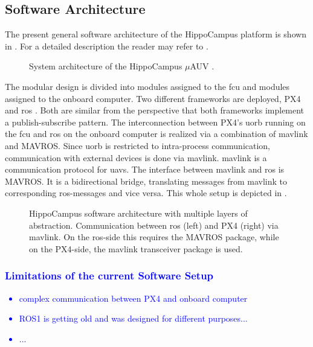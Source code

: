\subsection{Software Architecture}
The present general software architecture of the HippoCampus platform is shown in . For a detailed description the reader may refer to \cite{duecker-phd}. 
\begin{figure}[h!]
	\centering
     \def\svgwidth{12cm}  
	
	\caption{System architecture of the HippoCampus $\mu$AUV \cite{duecker-phd}.}
    \label{fig:software-architecture-overview}
\end{figure}
The modular design is divided into modules assigned to the \ac{fcu} and modules assigned to the onboard computer.
Two different frameworks are deployed, PX4 \cite{PX4} and \ac{ros} \cite{ros}.
Both are similar from the perspective that both frameworks implement a publish-subscribe pattern.
The interconnection between PX4's \ac{uorb} running on the \ac{fcu} and \ac{ros} on the onboard computer is realized via a combination of \ac{mavlink} \cite{mavlink} and MAVROS.
Since \ac{uorb} is restricted to intra-process communication, communication with external devices is done via \ac{mavlink}.
\ac{mavlink} is a communication protocol for \acp{uav}.
The interface between \ac{mavlink} and \ac{ros} is MAVROS. It is a bidirectional bridge, translating messages from \ac{mavlink} to corresponding \acs{ros}-messages and vice versa. This whole setup is depicted in .
\begin{figure}[h!]
	\centering
	
	\caption{HippoCampus software architecture with multiple layers of abstraction. Communication between \acs{ros} (left) and PX4 (right) via \acs{mavlink}. On the \acs{ros}-side this requires the MAVROS package, while on the PX4-side, the \acs{mavlink} transceiver package is used.}
    \label{fig:ros-px4-communication}
\end{figure}


\subsubsection{\textcolor{blue}{Limitations of the current Software Setup}}\label{sec:sw_limitatations}

\textcolor{blue}{
\begin{itemize}
    \item complex communication between PX4 and onboard computer
    \item ROS1 is getting old and was designed for different purposes...
    \item...
\end{itemize}
}


